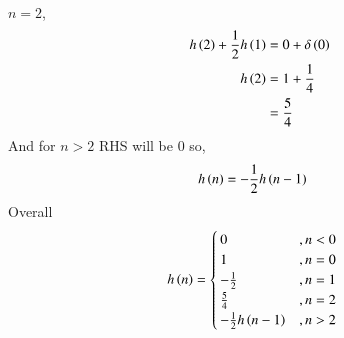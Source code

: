 \documentclass[journal,12pt,twocolumn]{IEEEtran}
\renewcommand\thesection{\arabic{section}}
\begin{document}
\begin{enumerate}[label=\thesection.\arabic*]
\begin{align}
     \end{align}
    $n=2$,
      \begin{align}
        h\left(2\right) + \frac{1}{2}h\left(1\right) &= 0 + \delta\left(0\right)\\
              h\left(2\right) &= 1 + \frac{1}{4}\\
                        &= \frac{5}{4}
      \end{align}
    And for $n>2$ RHS will be $0$ so,
      \begin{align}
        h\left(n\right) &= -\frac{1}{2}h\left(n-1\right)
      \end{align}
    Overall 
      \begin{align}
         h\left(n\right) &= \begin{cases}
                          0  &, n <0 \\
                          1  &, n = 0 \\
                        -\frac{1}{2} &, n=1 \\
                        \frac{5}{4} &, n =2\\
                        -\frac{1}{2}h\left(n-1\right) &, n >2
         \end{cases}
         \end{align}


\end{enumerate}
\end{document}

